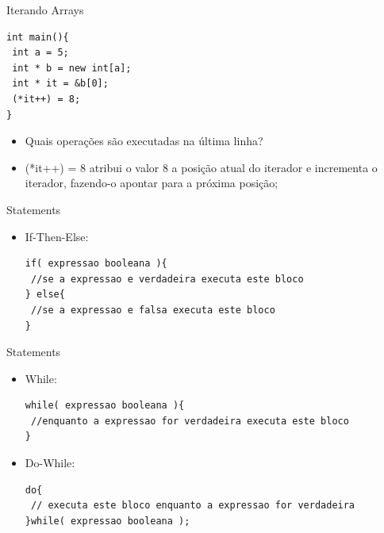 \documentclass[12pt,table,xcolor={dvipsnames}]{beamer}
\begin{document}
\begin{frame}[fragile]{Iterando Arrays}
\begin{lstlisting}
int main(){
 int a = 5;
 int * b = new int[a];
 int * it = &b[0];
 (*it++) = 8; 
}
\end{lstlisting}
\begin{itemize}
\item Quais operações são executadas na última linha?\pause
\item {\color{red}(*it++) = 8 atribui o valor 8 a posição atual do iterador e incrementa o iterador, fazendo-o apontar para a próxima posição;}
\end{itemize}
\end{frame}

\begin{frame}[fragile]{Statements}

\begin{itemize}
\item If-Then-Else:
\begin{lstlisting}
if( expressao booleana ){
 //se a expressao e verdadeira executa este bloco
} else{
 //se a expressao e falsa executa este bloco
}
\end{lstlisting}
\end{itemize}
\end{frame}

\begin{frame}[fragile]{Statements}

\begin{itemize}
\item While:
\begin{lstlisting}
while( expressao booleana ){
 //enquanto a expressao for verdadeira executa este bloco
}
\end{lstlisting}
\item Do-While:
\begin{lstlisting}
do{
 // executa este bloco enquanto a expressao for verdadeira
}while( expressao booleana );
\end{lstlisting}
\end{itemize}
\end{frame}
\end{document}
